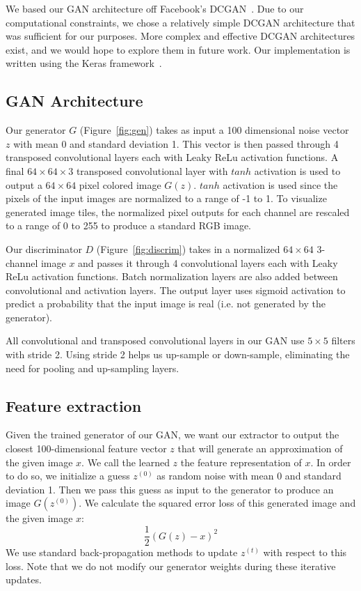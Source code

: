 \documentclass[11pt,twocolumn,letterpaper]{article}
\begin{document}
We based our GAN architecture off Facebook's DCGAN~\cite{facebook}. Due to our computational constraints, we chose a relatively simple DCGAN architecture that was sufficient for our purposes. More complex and effective DCGAN architectures exist, and we would hope to explore them in future work. Our implementation is written using the Keras framework~\cite{keras}.

\subsection{GAN Architecture}
Our generator $G$ (Figure~\ref{fig:gen}) takes as input a 100 dimensional noise vector $z$ with mean 0 and standard deviation 1. This vector is then passed through 4 transposed convolutional layers each with Leaky ReLu activation functions. A final $64 \times 64 \times 3$ transposed convolutional layer with $tanh$ activation is used to output a $64 \times 64$ pixel colored image $G(z)$. $tanh$ activation is used since the pixels of the input images are normalized to a range of -1 to 1. To visualize generated image tiles, the normalized pixel outputs for each channel are rescaled to a range of 0 to 255 to produce a standard RGB image.

Our discriminator $D$ (Figure~\ref{fig:discrim}) takes in a normalized $64 \times 64$ 3-channel image $x$ and passes it through 4 convolutional layers each with Leaky ReLu activation functions. Batch normalization layers are also added between convolutional and activation layers. The output layer uses sigmoid activation to predict a probability that the input image is real (i.e. not generated by the generator).

All convolutional and transposed convolutional layers in our GAN use $5 \times 5$ filters with stride 2. Using stride 2 helps us up-sample or down-sample, eliminating the need for pooling and up-sampling layers.


\subsection{Feature extraction} \label{sec:feat-approach}
Given the trained generator of our GAN, we want our extractor to output the closest 100-dimensional feature vector $z$ that will generate an approximation of the given image $x$. We call the learned $z$ the feature representation of $x$. In order to do so, we initialize a guess $z^{(0)}$ as random noise with mean 0 and standard deviation 1. Then we pass this guess as input to the generator to produce an image $G(z^{(0)})$. We calculate the squared error loss of this generated image and the given image $x$:
$$\frac{1}{2} (G(z) - x)^2$$ 
We use standard back-propagation methods to update $z^{(t)}$ with respect to this loss. Note that we do not modify our generator weights during these iterative updates.
\end{document}
